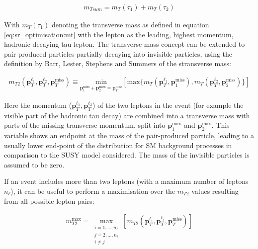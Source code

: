 \begin{align}
\label{eq:sr_optimisation:mtsum} m_{Tsum} = m_T(\tau_1)+m_T(\tau_2)
\end{align}

With $m_T(\tau_1)$ denoting the transverse mass as defined in equation \eqref{eq:sr_optimisation:mt} with the lepton as the leading,  highest momentum, hadronic decaying tau lepton. 
The transverse mass concept can be extended to pair produced particles partially decaying into invisible particles, using the definition by Barr, Lester,  Stephens and Summers \cite{mt2original, mt2discussion} of the stransverse mass:

\begin{align}
m_{T2} ( \textbf{p}_T^{\ell_1}, \textbf{p}_T^{\ell_2}, \textbf{p}_T^{\text{miss}}) \equiv  \underset{\textbf{p}_1^\text{miss} + \textbf{p}_2^\text{miss} = \textbf{p}_T^\text{miss}}{\text{min}} \left[ \text{max} \{ m_T(\textbf{p}_T^{\ell_1}, \textbf{p}_1^{\text{miss}}),   m_T(\textbf{p}_T^{\ell_2}, \textbf{p}_2^{\text{miss}}) \} \right]
\end{align}

Here the momentum ($\textbf{p}_T^{\ell_1}, \textbf{p}_T^{\ell_2}$) of the two leptons in the event (for example the visible part of the hadronic tau decay) are combined into a transverse mass with parts of the missing transverse momentum, split into $\textbf{p}_1^\text{miss}$ and $\textbf{p}_2^\text{miss}$.  
This variable shows an endpoint at the mass of the pair-produced particle,  leading to a usually lower end-point of the distribution for \ac{SM} background processes in comparison to the \ac{SUSY} model considered. The mass of the invisible particles is assumed to be zero.

If an event includes more than two leptons (with a maximum number of leptons $n_\ell$),  it can be useful to perform a maximisation over the $m_{T2}$ values resulting from all possible lepton pairs:

\begin{align}
m_{T2}^\text{max} = \max_{\substack{i = 1,...,n_\ell \\ j = 2,..., n_\ell \\ i \neq j}} \left[ m_{T2}(\textbf{p}_T^{\ell_i}, \textbf{p}_T^ {\ell_j},\textbf{p}_T^{\text{miss}}) \right] \label{eq:sr_optimisation:mt2max}
\end{align}

\FloatBarrier

